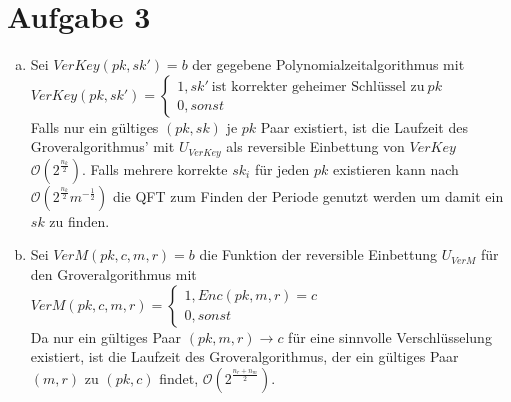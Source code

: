 \documentclass[a4paper]{scrartcl}
\begin{document}
\section*{Aufgabe 3}
\begin{enumerate}[a)]
\item Sei $VerKey(pk,sk')=b$ der gegebene Polynomialzeitalgorithmus mit\\
$VerKey(pk,sk')=\begin{cases} 1, sk' ~\text{ist korrekter geheimer Schlüssel zu}~ pk\\0, sonst \end{cases}$\\
Falls nur ein gültiges $(pk, sk)$ je $pk$ Paar existiert, ist die Laufzeit des Groveralgorithmus' mit $U_{VerKey}$ als reversible Einbettung von $VerKey$ $\mathcal{O}(2^{\frac{n_k}{2}})$. Falls mehrere korrekte $sk_i$ für jeden $pk$ existieren kann nach $\mathcal{O}(2^{\frac{n_k}{2}}m^{-\frac{1}{2}})$ die QFT zum Finden der Periode genutzt werden um damit ein $sk$ zu finden.
\item Sei $VerM(pk,c,m,r)=b$ die Funktion der reversible Einbettung $U_{VerM}$ für den Groveralgorithmus mit\\
$VerM(pk,c,m,r)=\begin{cases} 1, Enc(pk,m,r)=c\\0, sonst \end{cases}$\\
Da nur ein gültiges Paar $(pk,m,r)\rightarrow c$ für eine sinnvolle Verschlüsselung existiert, ist die Laufzeit des Groveralgorithmus, der ein gültiges Paar $(m,r)$ zu $(pk,c)$ findet, $\mathcal{O}(2^{\frac{n_r+n_m}{2}})$.
\end{enumerate}
\end{document}
